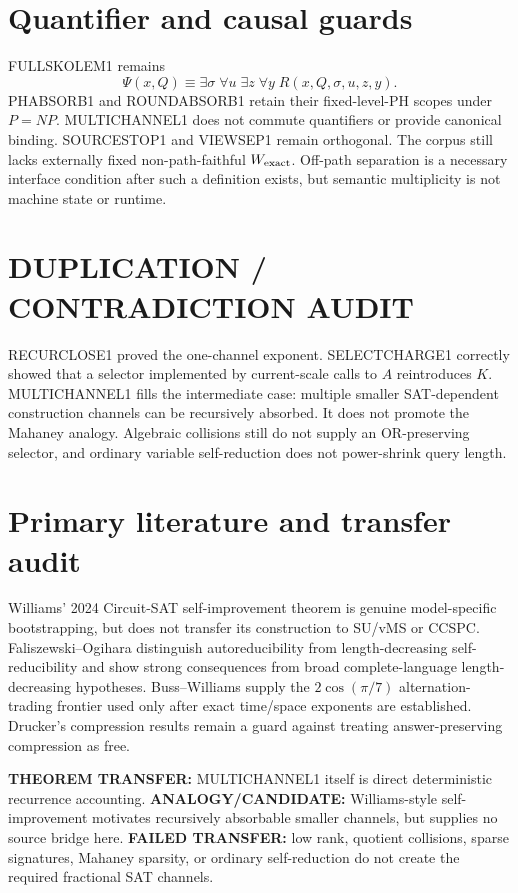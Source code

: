 \documentclass[11pt]{article}
\begin{document}
\section*{Quantifier and causal guards}
FULLSKOLEM1 remains
\[
\Psi(x,Q)\equiv\exists\sigma\;\forall u\;\exists z\;\forall y\;R(x,Q,\sigma,u,z,y).
\]
PHABSORB1 and ROUNDABSORB1 retain their fixed-level-PH scopes under \(P=NP\). MULTICHANNEL1 does not commute quantifiers or provide canonical binding. SOURCESTOP1 and VIEWSEP1 remain orthogonal. The corpus still lacks externally fixed non-path-faithful \(W_{\rm exact}\). Off-path separation is a necessary interface condition after such a definition exists, but semantic multiplicity is not machine state or runtime.

\section*{DUPLICATION / CONTRADICTION AUDIT}
RECURCLOSE1 proved the one-channel exponent. SELECTCHARGE1 correctly showed that a selector implemented by current-scale calls to \(A\) reintroduces \(K\). MULTICHANNEL1 fills the intermediate case: multiple smaller SAT-dependent construction channels can be recursively absorbed. It does not promote the Mahaney analogy. Algebraic collisions still do not supply an OR-preserving selector, and ordinary variable self-reduction does not power-shrink query length.

\section*{Primary literature and transfer audit}
Williams' 2024 Circuit-SAT self-improvement theorem is genuine model-specific bootstrapping, but does not transfer its construction to SU/vMS or CCSPC. Faliszewski--Ogihara distinguish autoreducibility from length-decreasing self-reducibility and show strong consequences from broad complete-language length-decreasing hypotheses. Buss--Williams supply the \(2\cos(\pi/7)\) alternation-trading frontier used only after exact time/space exponents are established. Drucker's compression results remain a guard against treating answer-preserving compression as free.

\textbf{THEOREM TRANSFER:} MULTICHANNEL1 itself is direct deterministic recurrence accounting.
\textbf{ANALOGY/CANDIDATE:} Williams-style self-improvement motivates recursively absorbable smaller channels, but supplies no source bridge here.
\textbf{FAILED TRANSFER:} low rank, quotient collisions, sparse signatures, Mahaney sparsity, or ordinary self-reduction do not create the required fractional SAT channels.
\end{document}

